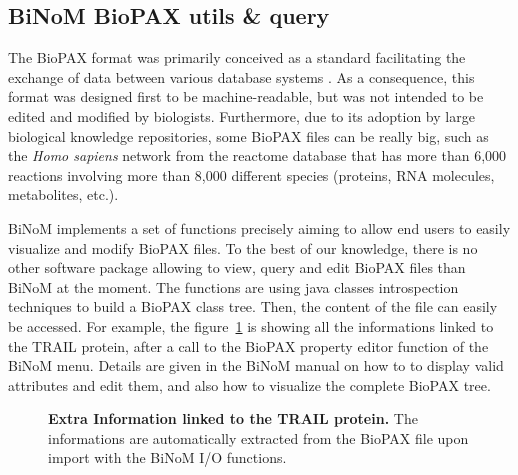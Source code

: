 \documentclass[10pt]{bmc_article}
\newenvironment{bmcformat}{\baselineskip20pt\sloppy\setboolean{publ}{false}}{\baselineskip20pt\sloppy}
\begin{document}
\begin{bmcformat}
\subsection*{BiNoM BioPAX utils \& query}
The BioPAX format was primarily conceived as a standard facilitating the
exchange of data between various database systems \cite{demir2010biopax}. As a
consequence, this format was designed first to be machine-readable, but was not
intended
to be edited and modified by biologists. Furthermore, due to its adoption by
large biological knowledge repositories, some BioPAX files can be really big,
such as the \textit{Homo sapiens} network from the reactome database
\cite{joshi2005reactome} that has more than 6,000 reactions involving more than
8,000 different species (proteins, RNA molecules, metabolites, etc.).

BiNoM implements a set of functions precisely aiming to allow end users to
easily visualize and modify BioPAX files. To the best of our knowledge, there is
no other software package allowing to view, query and edit BioPAX files than
BiNoM at the moment. The functions are using
java classes introspection techniques to build a BioPAX class tree. Then, the
content of the file can easily be accessed. For example, the figure~\ref{biopaxtrailprop} is
showing all the informations linked to the TRAIL protein, after a call to the
BioPAX property
editor function of the BiNoM menu. Details are given in the BiNoM manual on how
to to display valid attributes and edit them, and also how to visualize the
complete BioPAX tree.


\begin{figure}[h]
 \caption{\label{biopaxtrailprop}  \textbf{Extra Information linked to the TRAIL protein.}
      The informations are automatically extracted from the BioPAX file upon
import with the BiNoM I/O functions.}
\end{figure}



\end{bmcformat}
\end{document}
